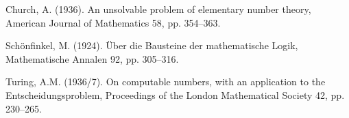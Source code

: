 \begin{thebibliography}{99}

 Church, A. (1936). An unsolvable problem of elementary number theory, American
Journal of Mathematics 58, pp. 354–363.

 Schönfinkel, M. (1924). Über die Bausteine der mathematische Logik, Mathematische
Annalen 92, pp. 305–316.

 Turing, A.M. (1936/7). On computable numbers, with an application to the
Entscheidungsproblem, Proceedings of the London Mathematical Society
42, pp. 230–265.

\end{thebibliography}
